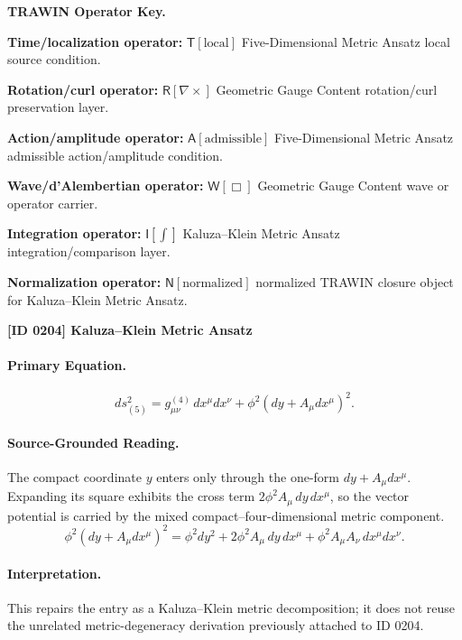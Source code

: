 \par\vspace{0.45\baselineskip}
\noindent\begin{minipage}[t]{\linewidth}
\begingroup
\small
\raggedright
\textbf{TRAWIN Operator Key.}\par
\noindent\textbf{Time/localization operator:} $\mathsf{T}\!\left[\mathrm{local}\right]$ Five-Dimensional Metric Ansatz local source condition.\par
\noindent\textbf{Rotation/curl operator:} $\mathsf{R}\!\left[\nabla\times\right]$ Geometric Gauge Content rotation/curl preservation layer.\par
\noindent\textbf{Action/amplitude operator:} $\mathsf{A}\!\left[\mathrm{admissible}\right]$ Five-Dimensional Metric Ansatz admissible action/amplitude condition.\par
\noindent\textbf{Wave/d'Alembertian operator:} $\mathsf{W}\!\left[\Box\right]$ Geometric Gauge Content wave or operator carrier.\par
\noindent\textbf{Integration operator:} $\mathsf{I}\!\left[\int\right]$ Kaluza--Klein Metric Ansatz integration/comparison layer.\par
\noindent\textbf{Normalization operator:} $\mathsf{N}\!\left[\mathrm{normalized}\right]$ normalized TRAWIN closure object for Kaluza--Klein Metric Ansatz.\par
\endgroup
\end{minipage}

\clearpage
\noindent\textbf{[ID 0204] Kaluza--Klein Metric Ansatz}\par
\vspace{0.35em}
\paragraph{Primary Equation.}
\[
ds^2_{(5)} = g^{(4)}_{\mu\nu}\,dx^{\mu}dx^{\nu} + \phi^2\!\left(dy + A_{\mu}dx^{\mu}\right)^2.
\]
\paragraph{Source-Grounded Reading.}
The compact coordinate $y$ enters only through the one-form $dy+A_{\mu}dx^{\mu}$. Expanding its square exhibits the cross term $2\phi^2 A_{\mu}\,dy\,dx^{\mu}$, so the vector potential is carried by the mixed compact--four-dimensional metric component.
\[
\phi^2\left(dy+A_{\mu}dx^{\mu}\right)^2=\phi^2dy^2+2\phi^2A_{\mu}\,dy\,dx^{\mu}+\phi^2A_{\mu}A_{\nu}\,dx^{\mu}dx^{\nu}.
\]
\paragraph{Interpretation.}
This repairs the entry as a Kaluza--Klein metric decomposition; it does not reuse the unrelated metric-degeneracy derivation previously attached to ID 0204.

